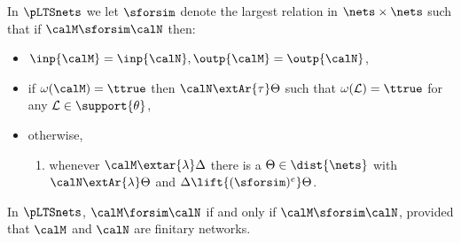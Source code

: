 \documentclass{LMCS}
\newcommand{\calL}{\ensuremath{{\mathcal{L}}}}
\begin{document}
\begin{defi}\rm\label{def:sims}
In  $\pLTSnets$ we let 
 $\sforsim$ denote the largest relation in $\nets\times {\nets}$
such that if ${\calM}  \sforsim \calN$ then: 
\begin{itemize}
\item $\inp{\calM} = \inp{\calN}, \outp{\calM} = \outp{\calN}$,
\item 
if $\omega(\calM) = \ttrue$  then $\calN \extAr{\tau} \Theta $
such that $\omega(\calL) = \ttrue$ for any $\calL \in \support{\theta}$,

\item otherwise, 
 \begin{enumerate}[label=(\roman*)]
  \item whenever $\calM\extar{\lambda}\Delta$
  there is a $\Theta \in \dist{\nets}$ with
  $\calN \extAr{\lambda}\Theta$ and $\Delta\lift{(\sforsim)^e}\Theta$.
 \end{enumerate}
  
\end{itemize}
\end{defi}

\begin{thm}\label{thm:altchar}
  In  $\pLTSnets$,
$\calM \forsim \calN$ if and only if $\calM \sforsim \calN$, 
  provided that $\calM$ and $\calN$ are finitary networks.
\end{thm}
\end{document}
